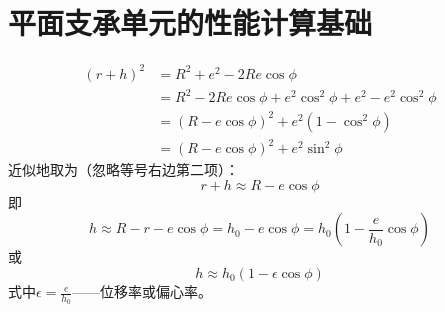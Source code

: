 \documentclass[UTF8, 12pt]{ctexbook}
\begin{document}
\section{平面支承单元的性能计算基础}
\begin{equation*}
\begin{aligned}
    (r+h)^2 
    &=R^2+e^2-2Re\cos\phi\\
    &=R^2-2Re\cos\phi+e^2\cos^2\phi+e^2-e^2\cos^2\phi\\
    &=(R-e\cos\phi)^2+e^2(1-\cos^2\phi)\\
    &=(R-e\cos\phi)^2+e^2\sin^2\phi
\end{aligned}
\end{equation*}
近似地取为（忽略等号右边第二项）：
\begin{equation*}
    r+h\approx R-e\cos\phi
\end{equation*}
即
\begin{equation*}
    h\approx R-r-e\cos\phi
    =h_0-e\cos\phi
    =h_0\left(1-\frac{e}{h_0}\cos\phi\right)
\end{equation*}
或
\begin{equation}
    h\approx h_0(1-\epsilon\cos\phi)
\end{equation}
式中$\epsilon=\frac{e}{h_0}$——位移率或偏心率。
\end{document}
